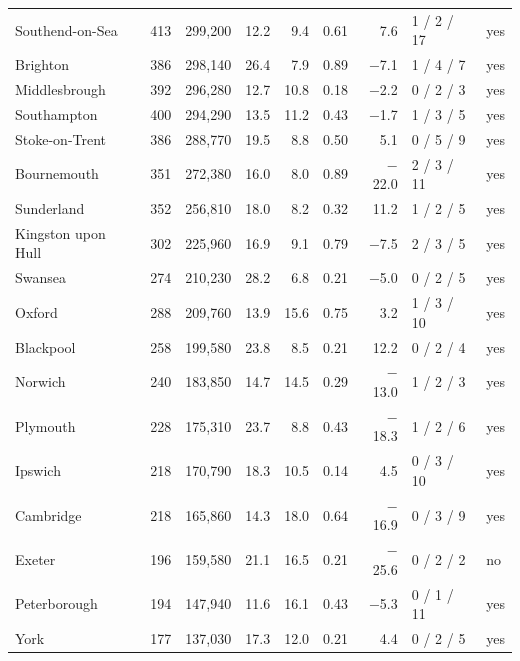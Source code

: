\documentclass[11pt,a4paper]{article}
\begin{document}
\begin{table}[tbp]
\begin{tabular}{lrrrrrrll}
Southend-on-Sea & 413 & 299,200 & 12.2 & 9.4 & 0.61 & 7.6 & 1 / 2 / 17 & yes\\
Brighton & 386 & 298,140 & 26.4 & 7.9 & 0.89 & $-$7.1 & 1 / 4 / 7 & yes\\
Middlesbrough & 392 & 296,280 & 12.7 & 10.8 & 0.18 & $-$2.2 & 0 / 2 / 3 & yes\\
Southampton & 400 & 294,290 & 13.5 & 11.2 & 0.43 & $-$1.7 & 1 / 3 / 5 & yes\\
Stoke-on-Trent & 386 & 288,770 & 19.5 & 8.8 & 0.50 & 5.1 & 0 / 5 / 9 & yes\\
Bournemouth & 351 & 272,380 & 16.0 & 8.0 & 0.89 & $-$22.0 & 2 / 3 / 11 & yes\\
Sunderland & 352 & 256,810 & 18.0 & 8.2 & 0.32 & 11.2 & 1 / 2 / 5 & yes\\
Kingston upon Hull & 302 & 225,960 & 16.9 & 9.1 & 0.79 & $-$7.5 & 2 / 3 / 5 & yes\\
Swansea & 274 & 210,230 & 28.2 & 6.8 & 0.21 & $-$5.0 & 0 / 2 / 5 & yes\\
Oxford & 288 & 209,760 & 13.9 & 15.6 & 0.75 & 3.2 & 1 / 3 / 10 & yes\\
Blackpool & 258 & 199,580 & 23.8 & 8.5 & 0.21 & 12.2 & 0 / 2 / 4 & yes\\
Norwich & 240 & 183,850 & 14.7 & 14.5 & 0.29 & $-$13.0 & 1 / 2 / 3 & yes\\
Plymouth & 228 & 175,310 & 23.7 & 8.8 & 0.43 & $-$18.3 & 1 / 2 / 6 & yes\\
Ipswich & 218 & 170,790 & 18.3 & 10.5 & 0.14 & 4.5 & 0 / 3 / 10 & yes\\
Cambridge & 218 & 165,860 & 14.3 & 18.0 & 0.64 & $-$16.9 & 0 / 3 / 9 & yes\\
Exeter & 196 & 159,580 & 21.1 & 16.5 & 0.21 & $-$25.6 & 0 / 2 / 2 & no\\
Peterborough & 194 & 147,940 & 11.6 & 16.1 & 0.43 & $-$5.3 & 0 / 1 / 11 & yes\\
York & 177 & 137,030 & 17.3 & 12.0 & 0.21 & 4.4 & 0 / 2 / 5 & yes\\
\bottomrule\end{tabular}\end{table}
\end{document}
